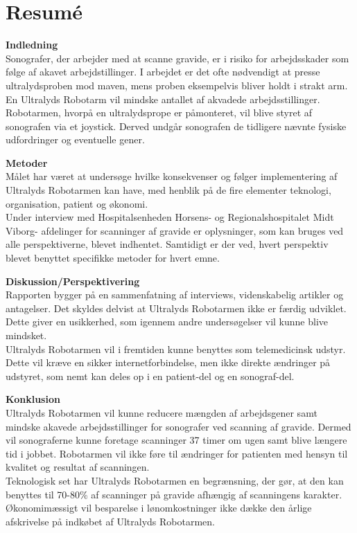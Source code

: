 \chapter{Resumé}
\textbf{Indledning} \\ 
Sonografer, der arbejder med at scanne gravide, er i risiko for arbejdsskader  som følge af akavet arbejdstillinger. I arbejdet er det ofte nødvendigt at presse ultralydsproben mod maven, mens proben eksempelvis bliver holdt i strakt arm. En Ultralyds Robotarm vil mindske antallet af akvadede arbejdsstillinger. Robotarmen, hvorpå en ultralydsprope er påmonteret, vil blive styret af sonografen via et joystick. Derved undgår sonografen de tidligere nævnte fysiske udfordringer og eventuelle gener. 

\textbf{Metoder} \\ 
Målet har været at undersøge hvilke konsekvenser  og følger implementering af Ultralyds Robotarmen kan  have, med henblik på de fire elementer teknologi, organisation, patient og økonomi. \\
Under interview med Hospitalsenheden Horsens- og Regionalshospitalet Midt Viborg- afdelinger for scanninger af gravide er  oplysninger, som kan bruges ved alle perspektiverne, blevet indhentet. Samtidigt er der ved, hvert perspektiv blevet benyttet  specifikke metoder for hvert emne. 

\textbf{Diskussion/Perspektivering} \\ 
Rapporten bygger på en sammenfatning af interviews, videnskabelig artikler og antagelser. Det skyldes delvist at Ultralyds Robotarmen ikke er færdig udviklet. Dette giver en usikkerhed, som igennem andre undersøgelser vil kunne blive mindsket. \\
Ultralyds Robotarmen vil  i fremtiden kunne benyttes som telemedicinsk udstyr. Dette vil kræve en sikker internetforbindelse, men ikke direkte ændringer på udstyret, som nemt kan deles op i en patient-del og en sonograf-del.  

\textbf{Konklusion} \\
Ultralyds Robotarmen vil kunne reducere mængden af arbejdsgener samt mindske akavede arbejdsstillinger for sonografer ved scanning af gravide. Dermed vil sonograferne kunne foretage scanninger 37 timer om ugen samt blive længere tid i jobbet. Robotarmen vil ikke føre til ændringer for patienten med hensyn til kvalitet og resultat af scanningen. \\
Teknologisk set har Ultralyds Robotarmen en begrænsning, der gør, at den kan benyttes til 70-80\% af scanninger på gravide afhængig af scanningens karakter. \\
Økonomimæssigt vil besparelse i lønomkostninger ikke dække den årlige afskrivelse på indkøbet af Ultralyds Robotarmen.